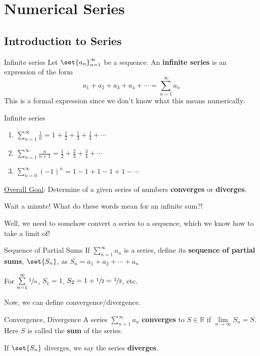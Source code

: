 \chapter{Numerical Series}
\section{Introduction to Series}
\begin{Definition}{Infinite series}{}
    Let $ \set{a_n}_{n=1}^\infty $ be a sequence. An
    \textbf{infinite series} is an expression of the form
    \[ a_1+a_2+a_3+a_4+\cdots=\sum\limits_{n=1}^{\infty}a_n \]
    This is a formal expression since we don't know what this means numerically.
\end{Definition}

\begin{Example}{Infinite series}{}
    \begin{enumerate}[label=(\roman*)]
        \item $ \displaystyle\sum\limits_{n=1}^{\infty} \frac{1}{n} =1+\frac{1}{2} +\frac{1}{3} +\frac{1}{4}+\cdots $
        \item $ \displaystyle\sum\limits_{n=1}^{\infty} \frac{n}{n+1} =\frac{1}{2} +\frac{2}{3} +\frac{3}{4} +\cdots $
        \item $ \displaystyle\sum\limits_{n=0}^{\infty} (-1)^n=1-1+1-1+1-\cdots $
    \end{enumerate}
\end{Example}
\underline{Overall Goal}: Determine of a given series of numbers \textbf{converges}
or \textbf{diverges}.

Wait a minute! What do these words mean for an infinite sum?!

Well, we need to somehow convert a series to a sequence, which we know how to take a limit of!

\begin{Definition}{Sequence of Partial Sums}{}
    If $ \sum\limits_{n=1}^{\infty} a_n $ is a series, define its
    \textbf{sequence of partial sums}, $ \set{S_n} $, as $ S_n=a_1+a_2+\cdots+a_n $
\end{Definition}

\begin{Example}{}{}
    For $ \sum\limits_{n=1}^{\infty} \sfrac{1}{n} $, $ S_1=1 $, $ S_2=1+\sfrac{1}{2}=\sfrac{3}{2} $,
    etc.
\end{Example}

Now, we can define convergence/divergence.

\begin{Definition}{Convergence, Divergence}{}
    A series $ \sum\limits_{n=1}^{\infty} a_n $ \textbf{converges} to $ S\in\mathbb{R} $
    if $ \lim\limits_{{n} \to {\infty}} S_n=S $. Here $ S $ is called the \textbf{sum}
    of the series.

    If $ \set{S_n} $ diverges, we say the series \textbf{diverges}.
\end{Definition}

